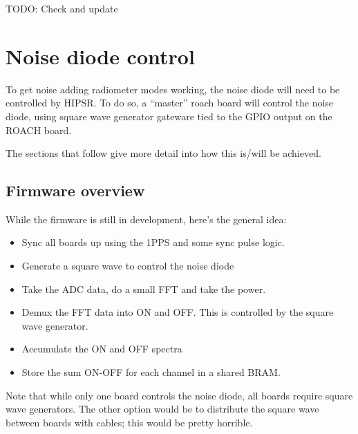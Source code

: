 \documentclass[letterpaper,10pt,english]{sphinxmanual}
\begin{document}
TODO: Check and update


\chapter{Noise diode control}
\label{noise_diode:noise-diode-control}\label{noise_diode::doc}
To get noise adding radiometer modes working, the noise diode will need to be controlled by HIPSR.
To do so, a ``master'' roach board will control the noise diode, using square wave generator gateware
tied to the GPIO output on the ROACH board.

The sections that follow give more detail into how this is/will be achieved.


\section{Firmware overview}
\label{noise_diode:firmware-overview}
While the firmware is still in development, here's the general idea:
\begin{itemize}
\item {} 
Sync all boards up using the 1PPS and some sync pulse logic.

\item {} 
Generate a square wave to control the noise diode

\item {} 
Take the ADC data, do a small FFT and take the power.

\item {} 
Demux the FFT data into ON and OFF. This is controlled by the square wave generator.

\item {} 
Accumulate the ON and OFF spectra

\item {} 
Store the sum ON-OFF for each channel in a shared BRAM.

\end{itemize}

Note that while only one board controls the noise diode, all boards require square wave generators.
The other option would be to distribute the square wave between boards with cables; this would be
pretty horrible.
\end{document}
